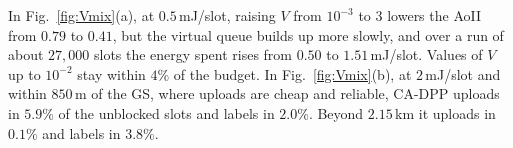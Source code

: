 In Fig.~\ref{fig:Vmix}(a), at $0.5$\,mJ/slot, raising $V$ from $10^{-3}$ to $3$ lowers the AoII from $0.79$ to $0.41$, but the virtual queue builds up more slowly, and over a run of about $27{,}000$ slots the energy spent rises from $0.50$ to $1.51$\,mJ/slot. Values of $V$ up to $10^{-2}$ stay within $4\%$ of the budget. In Fig.~\ref{fig:Vmix}(b), at $2$\,mJ/slot and within $850$\,m of the GS, where uploads are cheap and reliable, CA-DPP uploads in $5.9\%$ of the unblocked slots and labels in $2.0\%$. Beyond $2.15$\,km it uploads in $0.1\%$ and labels in $3.8\%$.
